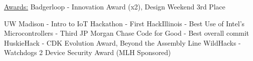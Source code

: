 \documentclass[../main.tex]{subfiles}%
\begin{document}
\underline{Awards:}\hspace{4.4em}\small%
Badgerloop - Innovation Award (x2), Design Weekend 3rd Place
\begin{adjustwidth}{1.2in}{0in}
UW Madison - Intro to IoT Hackathon - First\break
HackIllinois - Best Use of Intel's Microcontrollers - Third\break
JP Morgan Chase Code for Good - Best overall commit\break
HuskieHack - CDK Evolution Award, Beyond the Assembly Line\break
WildHacks - Watchdogs 2 Device Security Award (MLH Sponsored)
\end{adjustwidth}
\end{document}
